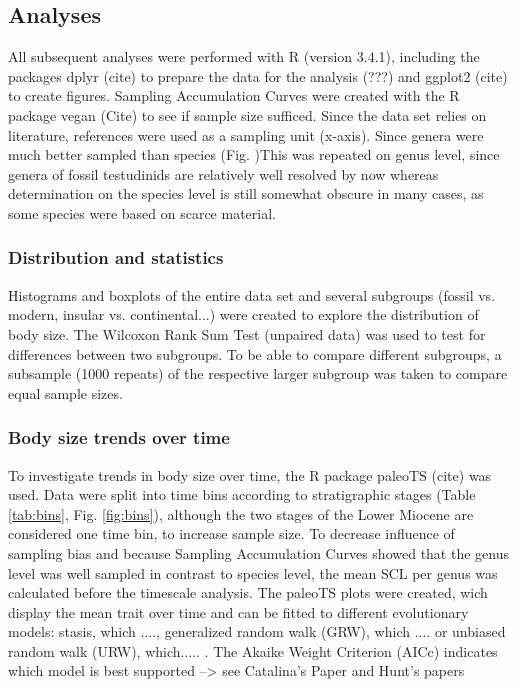 \subsection{Analyses}
All subsequent analyses were performed with R (version 3.4.1), including the packages dplyr (cite) to prepare the data for the analysis (???) and ggplot2 (cite) to create figures. Sampling Accumulation Curves were created with the R package vegan (Cite) to see if sample size sufficed.
 Since the data set relies on literature, references were used as a sampling unit (x-axis).%
Since genera were much better sampled than species (Fig. )This was repeated on genus level, since genera of fossil testudinids are relatively well resolved by now whereas determination on the species level is still somewhat obscure in many cases, as some species were based on scarce material. 


\subsubsection{Distribution and statistics}
Histograms and boxplots of the entire data set and several subgroups (fossil vs. modern, insular vs. continental...) were created to explore the distribution of body size. The Wilcoxon Rank Sum Test (unpaired data) was used to test for differences between two subgroups. To be able to compare different subgroups, a subsample (1000 repeats) of the respective larger subgroup was taken to compare equal sample sizes. 


\subsubsection{Body size trends over time}
To investigate trends in body size over time, the R package paleoTS (cite) was used. Data were split into time bins according to stratigraphic stages (Table \ref{tab:bins}, Fig. \ref{fig:bins}), although the two stages of the Lower Miocene are considered one time bin, to increase sample size. To decrease influence of sampling bias and because Sampling Accumulation Curves showed that the genus level was well sampled in contrast to species level, the mean SCL per genus was calculated before the timescale analysis. The paleoTS plots were created, wich display the mean trait over time and can be fitted to different evolutionary models: stasis, which ...., generalized random walk (GRW), which .... or unbiased random walk (URW), which..... . The Akaike Weight Criterion (AICc) indicates which model is best supported --> see Catalina's Paper and Hunt's papers


